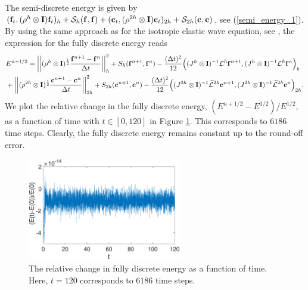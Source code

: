 The semi-discrete energy is given by $({\bf f}_t,({\rho}^h\otimes{\bf I}){\bf f}_t)_h + \mathcal{S}_h({\bf f},{\bf f}) + ({\bf c}_t,({\rho}^{2h}\otimes{\bf I}){\bf c}_t)_{2h} + \mathcal{S}_{2h}({\bf c},{\bf c})$, see (\ref{semi_energy_1}). By using the same approach as for the isotropic elastic wave equation, see \cite{petersson2015wave,sjogreen2012fourth},  the expression for the fully discrete energy reads 
\begin{align*}
&E^{n+1/2} = \left|\left|(\rho^h\otimes {\bf I})^{\frac{1}{2}}\frac{{\bf f}^{n+1}-{\bf f}^n}{\Delta t}\right|\right|_h^2 + S_h({\bf f}^{n+1},{\bf f}^n) - \frac{(\Delta t)^2}{12}\Big((J^h\otimes{\bf I})^{-1}\mathcal{L}^h{\bf f}^{n+1},(J^h\otimes{\bf I})^{-1}\mathcal{L}^h{\bf f}^n\Big)_h\\
&+ \left|\left|(\rho^{2h}\otimes{\bf I})^{\frac{1}{2}}\frac{{\bf c}^{n+1}-{\bf c}^n}{\Delta t}\right|\right|_{2h}^2 + S_{2h}({\bf c}^{n+1},{\bf c}^n) - \frac{(\Delta t)^2}{12}\Big((J^{2h}\otimes{\bf I})^{-1}\widetilde{\mathcal{L}}^{2h}{\bf c}^{n+1},(J^{2h}\otimes{\bf I})^{-1}\widetilde{\mathcal{L}}^{2h}{\bf c}^n\Big)_{2h}.
\end{align*}
We plot the relative change in the fully discrete energy, $(E^{n+1/2}-E^{1/2})/E^{1/2}$, as a function of time with $t\in[0,120]$ in Figure \ref{discrete_energy}. This corresponds to $6186$ time steps. Clearly, the fully discrete energy remains constant up to the round-off error.
\begin{figure}[htbp]
	\centering
	\includegraphics[width=0.6\textwidth,trim={0cm 0cm 0cm 0cm}, clip]{discrete_energy.eps}
	\caption{The relative change in fully discrete energy as a function of time. Here, $t = 120$ corresponds to $6186$ time steps.}\label{discrete_energy}
\end{figure}


